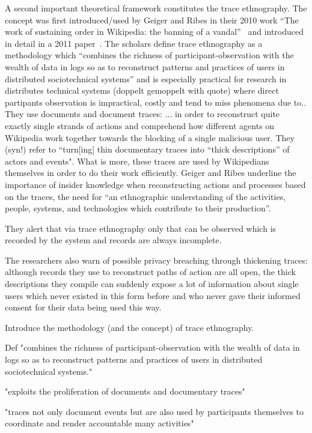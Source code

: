 A second important theoretical framework constitutes the trace ethnography.
The concept was first introduced/used by Geiger and Ribes in their 2010 work ``The work of sustaining order in Wikipedia: the banning of a vandal''~\cite{GeiRib2010} and introduced in detail in a 2011 paper~\cite{GeiRib2011}.
The scholars define trace ethnography as a methodology which
``combines the richness of participant-observation
with the wealth of data in logs so as to reconstruct
patterns and practices of users in distributed
sociotechnical systems''
and is especially practical for research in distributes technical systems (doppelt gemoppelt with quote) where direct partipants observation is impractical, costly and tend to miss phenomena due to..
They use documents and document traces: ... %
in order to reconstruct quite exactly single strands of actions and comprehend how different agents on Wikipedia work together towards the blocking of a single malicious user.
They (syn!) refer to ``turn[ing] thin documentary traces into “thick descriptions” of actors and events".
What is more, these traces are used by Wikipedians themselves in order to do their work efficiently.
Geiger and Ribes underline the importance of insider knowledge when reconstructing actions and processes based on the traces,
the need for ``an ethnographic understanding of the activities, people, systems, and technologies which contribute to their production''.

They alert that via trace ethnography only that can be observed which is recorded by the system and records are always incomplete.

The researchers also warn of possible privacy breaching through thickening traces:
although records they use to reconstruct paths of action are all open, the thick descriptions they compile can suddenly expose a lot of information about single users which never existed in this form before and who never gave their informed consent for their data being used this way.

\cite{GeiRib2011}
Introduce the methodology (and the concept) of trace ethnography.

Def
"combines the richness of participant-observation
with the wealth of data in logs so as to reconstruct
patterns and practices of users in distributed
sociotechnical systems."

"exploits the proliferation of
documents and documentary traces"

"traces not only
document events but are also used by participants
themselves to coordinate and render accountable many
activities"

